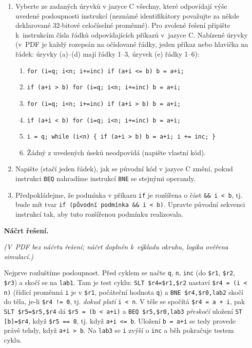 \begin{enumerate}
\item Vyberte ze zadaných úryvků v jazyce C všechny, které odpovídají výše uvedené
  posloupnosti instrukcí (neznámé identifikátory považujte za někde deklarované
  32-bitové celočíselné proměnné). Pro zvolené řešení připište k~instrukcím čísla řádků
  odpovídajících příkazů v~jazyce C. Nabízené úryvky (v~PDF je každý rozepsán na očíslované
  řádky, jeden příkaz nebo hlavička na řádek: úryvky (a)--(d) mají řádky 1--3, úryvek (e) řádky 1--6):

  \begin{enumerate}
    \item \texttt{for (i=q; i<n; i+=inc) if (a+i <= b) b = a+i;}
    \item \texttt{if (a+i > b) for (i=q; i<n; i+=inc) b = a+i;}
    \item \texttt{for (i=q; i<n; i+=inc) if (a+i > b) b = a+i;}
    \item \texttt{if (a+i < b) for (i=q; i<n; i+=inc) b = a+i;}
    \item \texttt{i = q; while (i<n) \{ if (a+i > b) b = a+i; i += inc; \}}
    \item Žádný z uvedených úseků neodpovídá (napište vlastní kód).
  \end{enumerate}

\item Napište (stačí jeden řádek), jak se původní kód v jazyce C změní, pokud
  instrukci \texttt{BEQ} nahradíme instrukcí \texttt{BNE} se stejnými operandy.

\item Předpokládejme, že podmínka v příkazu \texttt{if} je rozšířena o část
  \texttt{\&\& i < b}, tj. bude mít tvar \texttt{if (původní podmínka \&\& i < b)}.
  Upravte původní sekvenci instrukcí tak, aby tuto rozšířenou podmínku realizovala.
\end{enumerate}

\medskip
\noindent\textbf{Náčrt řešení.}\par
\textit{(V~PDF bez náčrtu řešení; náčrt doplněn k~výkladu okruhu, logika ověřena
simulací.)}

\medskip
Nejprve rozluštíme posloupnost. Před cyklem se načte \texttt{q}, \texttt{n},
\texttt{inc} (do \texttt{\$r1}, \texttt{\$r2}, \texttt{\$r3}) a skočí se na
\texttt{lab1}. Tam je test cyklu: \texttt{SLT \$r4=\$r1,\$r2} nastaví
\texttt{\$r4 = (i < n)} (řídicí proměnná \texttt{i} je v \texttt{\$r1}, počáteční
hodnota \texttt{q}) a \texttt{BNE \$r4,\$r0,lab2} skočí do těla, je-li
\texttt{\$r4 != 0}, tj. \emph{dokud platí} \texttt{i < n}. V těle se spočítá
\texttt{\$r4 = a + i}, pak \texttt{SLT \$r5=\$r5,\$r4} dá \texttt{\$r5 = (b < a+i)}
a \texttt{BEQ \$r5,\$r0,lab3} \emph{přeskočí} uložení \texttt{ST [b]=\$r4}, když
\texttt{\$r5 == 0}, tj. když \texttt{a+i <= b}. Uložení \texttt{b = a+i} se tedy
provede právě tehdy, když \texttt{a+i > b}. Na \texttt{lab3} se \texttt{i} zvýší
o \texttt{inc} a běh pokračuje testem cyklu.

